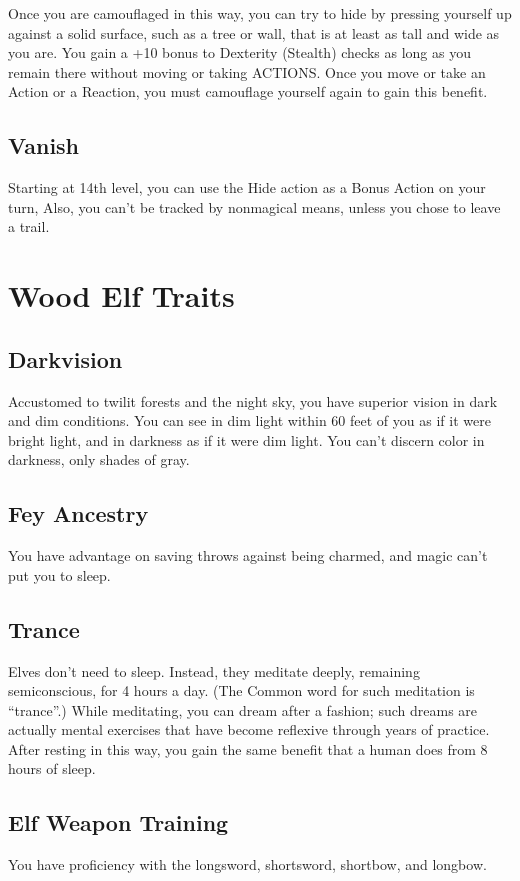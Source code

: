 \documentclass[letterpaper,openany,oneside,twocolumn]{book}
\begin{document}
Once you are camouflaged in this way, you can try to hide by pressing yourself up against a solid surface, such as a tree or wall, that is at least as tall and wide as you are. You gain a +10 bonus to Dexterity (Stealth) checks as long as you remain there without moving or taking ACTIONS. Once you move or take an Action or a Reaction, you must camouflage yourself again to gain this benefit.

\subsection*{Vanish}
Starting at 14th level, you can use the Hide action as a Bonus Action on your turn, Also, you can't be tracked by nonmagical means, unless you chose to leave a trail.

\section*{Wood Elf Traits}
\subsection*{Darkvision}
Accustomed to twilit forests and the night sky, you have superior vision in dark and dim conditions. You can see in dim light within 60 feet of you as if it were bright light, and in darkness as if it were dim light. You can't discern color in darkness, only shades of gray.

\subsection*{Fey Ancestry}
You have advantage on saving throws against being charmed, and magic can't put you to sleep.

\subsection*{Trance}
Elves don't need to sleep. Instead, they meditate deeply, remaining semiconscious, for 4 hours a day. (The Common word for such meditation is “trance”.) While meditating, you can dream after a fashion; such dreams are actually mental exercises that have become reflexive through years of practice. After resting in this way, you gain the same benefit that a human does from 8 hours of sleep.

\subsection*{Elf Weapon Training}
You have proficiency with the longsword, shortsword, shortbow, and longbow.
\end{document}
